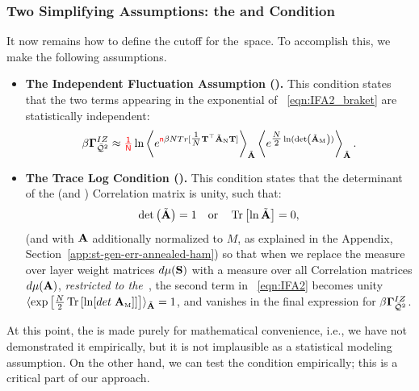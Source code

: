 \subsubsection{Two Simplifying Assumptions: the \IFA and \TRACELOG Condition}
\label{sxn:matgen_quality_hciz_C}

It now remains how to define the cutoff for the~\ECS space. To accomplish this, we make the following assumptions.
\begin{itemize}
\item
\textbf{The Independent Fluctuation Assumption (\IFA).}
This condition states that the two terms appearing in the exponential of \EQN~\ref{eqn:IFA2_braket} are statistically independent:
\begin{align}
  \label{eqn:IFA2}
  \beta\mathbf{\Gamma}^{IZ}_{\bar{\mathcal{Q}}^{2}} \approx 
    {\color{red}\sf{\tfrac{1}{N}}}
\ln
  \left\langle
  e^{{\color{red}\sf{n}}\beta N Tr[ \tfrac{1}{N}{\mathbf{T}}^{\top}\tilde{\mathbf{A}}_{\text{\tiny N}}{\mathbf{T}}] }
  \right\rangle_{\tilde{\mathbf{A}}}
  \left\langle
  e^{\tfrac{N}{2}\ln(\mbox{}{\text{det}}\left(\tilde{\mathbf{A}}_{\text{\tiny M}}\right))}
    \right\rangle_{\tilde{\mathbf{A}}}.
\end{align}
\item
\textbf{The Trace Log Condition (\TRACELOG).}
This condition states that the determinant of the \Student (and \Teacher) Correlation matrix is unity, such that:
\begin{align}
\label{eqn:tlc_mm}
\mbox{}{\text{det}}\left(\tilde{\mathbf{A}}\right)=1 
\quad\mbox{or}\quad
\mbox{}\operatorname{Tr}\left[\ln \tilde{\mathbf{A}}\right]=0  ,
\end{align}
(and with $\mathbf{A}$ additionally normalized to $M$, as explained in the Appendix, Section~\ref{app:st-gen-err-annealed-ham})
so that when we replace the measure over \Student layer weight matrices $d\mu({\mathbf{S}})$ with a measure over all \Student Correlation matrices $d\mu(\mathbf{A})$,
\emph{restricted to the~\ECS}, the second term in \EQN~\ref{eqn:IFA2} becomes unity
$\langle \exp\left[\tfrac{N}{2} \mbox{}\operatorname{Tr}\left[ \ln[det\;{\mathbf{A}}_{\text{\tiny M}}] \right] \right]\rangle_{\tilde{\mathbf{A}}}=1$,
and vanishes in the final expression for $\beta\mathbf{\Gamma}^{IZ}_{\bar{\mathcal{Q}}^{2}}$.
\end{itemize}

\noindent
At this point, the \IFA is made purely for mathematical convenience, i.e., 
we have not demonstrated it empirically, but it is not implausible as a statistical modeling assumption. 
On the other hand, we can test the \TRACELOG condition empirically;
this is a critical part of our \SETOL approach.


